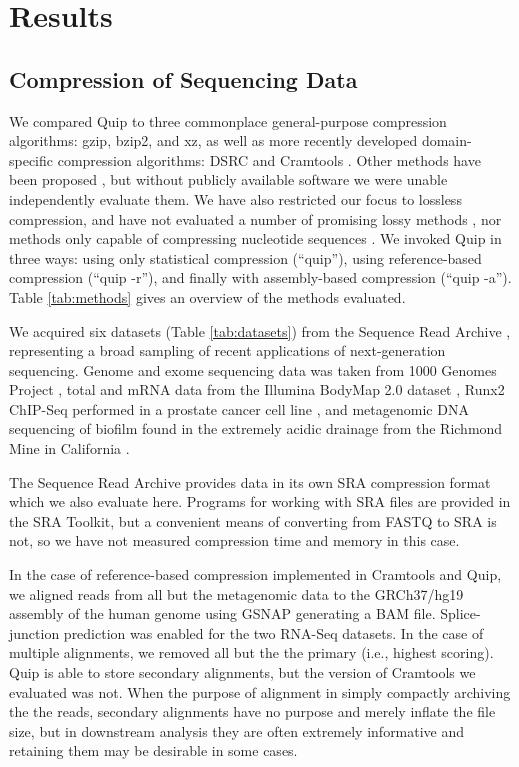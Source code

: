 \documentclass[a4,center,fleqn]{NAR}
\begin{document}
\section{Results}

\subsection{Compression of Sequencing Data}


We compared Quip to three commonplace general-purpose compression algorithms:
gzip, bzip2, and xz, as well as more recently developed domain-specific
compression algorithms: DSRC \citep{Deorowicz2011} and Cramtools
\citep{Hsi-YangFritz2011}. Other methods have been proposed \citep{Tembe2010,
Kozanitis2011, Bhola2011}, but without publicly available software we were
unable independently evaluate them. We have also restricted our focus to
lossless compression, and have not evaluated a number of promising lossy
methods \citep{Hsi-YangFritz2011,Wan2011}, nor methods only capable
of compressing nucleotide sequences \citep{Cox2012}. We invoked Quip in three
ways: using only statistical compression (``quip''), using reference-based
compression (``quip -r''), and finally with assembly-based compression (``quip
-a''). Table \ref{tab:methods} gives an overview of the methods evaluated.

We acquired six datasets (Table \ref{tab:datasets}) from the Sequence Read
Archive \citep{Leinonen2011}, representing a broad sampling of recent
applications of next-generation sequencing. Genome and exome sequencing data was
taken from 1000 Genomes Project
\citep{The1000GenomesConsortium2010},
total and mRNA data from the Illumina BodyMap
2.0 dataset \citep{Asmann2012},
Runx2 ChIP-Seq performed in a prostate cancer cell line 
\citep{Little2011}, and metagenomic DNA sequencing of biofilm found in the extremely acidic
drainage from the Richmond Mine in California
\citep{Denef2010}.

The Sequence Read Archive provides data in its own SRA compression format
which we also evaluate here. Programs for working with SRA files are provided
in the SRA Toolkit, but a convenient means of converting from FASTQ to SRA is
not, so we have not measured compression time and memory in this case.


In the case of reference-based compression implemented in Cramtools and Quip, we
aligned reads from all but the metagenomic data to the GRCh37/hg19 assembly of
the human genome using GSNAP \citep{Wu2010} generating a BAM file.
Splice-junction prediction was enabled for the two RNA-Seq datasets. In the case of
multiple alignments, we removed all but the the primary (i.e., highest
scoring). Quip is able to store secondary alignments, but the version of
Cramtools we evaluated was not. When the purpose of alignment in simply
compactly archiving the the reads, secondary alignments have no purpose and
merely inflate the file size, but in downstream analysis they are often
extremely informative and retaining them may be desirable in some cases.
\end{document}
